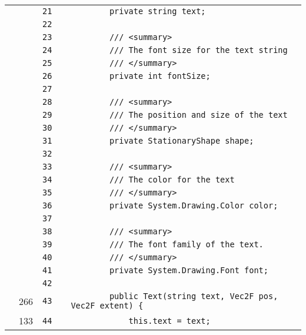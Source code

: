 \documentclass[a4paper,landscape,10pt]{article}
\begin{document}
\begin{longtable}[l]{lrrll}
\cellcolor{gray} &  & \verb~21~ & & \verb~        private string text;~\\
\cellcolor{gray} &  & \verb~22~ & & \verb~~\\
\cellcolor{gray} &  & \verb~23~ & & \verb~        /// <summary>~\\
\cellcolor{gray} &  & \verb~24~ & & \verb~        /// The font size for the text string~\\
\cellcolor{gray} &  & \verb~25~ & & \verb~        /// </summary>~\\
\cellcolor{gray} &  & \verb~26~ & & \verb~        private int fontSize;~\\
\cellcolor{gray} &  & \verb~27~ & & \verb~~\\
\cellcolor{gray} &  & \verb~28~ & & \verb~        /// <summary>~\\
\cellcolor{gray} &  & \verb~29~ & & \verb~        /// The position and size of the text~\\
\cellcolor{gray} &  & \verb~30~ & & \verb~        /// </summary>~\\
\cellcolor{gray} &  & \verb~31~ & & \verb~        private StationaryShape shape;~\\
\cellcolor{gray} &  & \verb~32~ & & \verb~~\\
\cellcolor{gray} &  & \verb~33~ & & \verb~        /// <summary>~\\
\cellcolor{gray} &  & \verb~34~ & & \verb~        /// The color for the text~\\
\cellcolor{gray} &  & \verb~35~ & & \verb~        /// </summary>~\\
\cellcolor{gray} &  & \verb~36~ & & \verb~        private System.Drawing.Color color;~\\
\cellcolor{gray} &  & \verb~37~ & & \verb~~\\
\cellcolor{gray} &  & \verb~38~ & & \verb~        /// <summary>~\\
\cellcolor{gray} &  & \verb~39~ & & \verb~        /// The font family of the text.~\\
\cellcolor{gray} &  & \verb~40~ & & \verb~        /// </summary>~\\
\cellcolor{gray} &  & \verb~41~ & & \verb~        private System.Drawing.Font font;~\\
\cellcolor{gray} &  & \verb~42~ & & \verb~~\\
\cellcolor{green} & 266 & \verb~43~ & & \verb~        public Text(string text, Vec2F pos, Vec2F extent) {~\\
\cellcolor{green} & 133 & \verb~44~ & & \verb~            this.text = text;~\\

\end{longtable}
\end{document}
